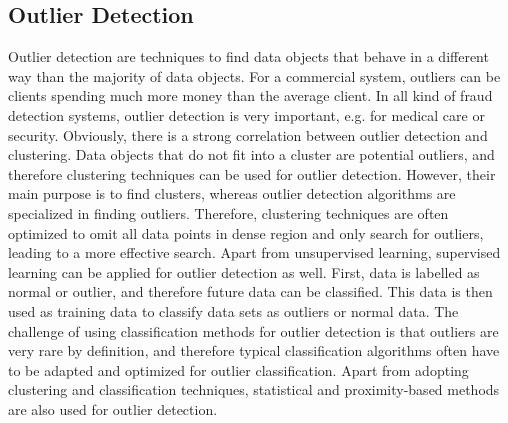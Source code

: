 \subsection{Outlier Detection}

Outlier detection are techniques to find data objects that behave in a different way than the majority of data objects. For a commercial system, outliers can be clients spending much more money than the average client. In all kind of fraud detection systems, outlier detection is very important, e.g. for medical care or security. 
Obviously, there is a strong correlation between outlier detection and clustering. Data objects that do not fit into a cluster are potential outliers, and therefore clustering techniques can be used for outlier detection. However, their main purpose is to find clusters, whereas outlier detection algorithms are specialized in finding outliers. Therefore, clustering techniques are often optimized to omit all data points in dense region and only search for outliers, leading to a more effective search.
Apart from unsupervised learning, supervised learning can be applied for outlier detection as well. First, data is labelled as normal or outlier, and therefore future data can be classified. This data is then used as training data to classify data sets as outliers or normal data. The challenge of using classification methods for outlier detection is that outliers are very rare by definition, and therefore typical classification algorithms often have to be adapted and optimized for outlier classification.
Apart from adopting clustering and classification techniques, statistical and proximity-based methods are also used for outlier detection.


